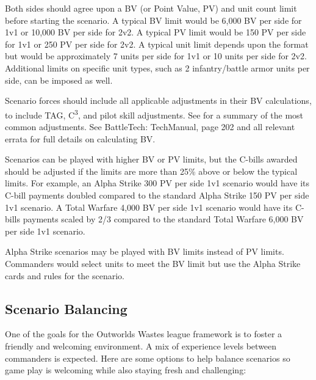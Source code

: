 \documentclass{article}
\begin{document}
Both sides should agree upon a BV (or Point Value, PV) and unit count limit before starting the scenario.
A typical BV limit would be 6,000 BV per side for 1v1 or 10,000 BV per side for 2v2.
A typical PV limit would be 150 PV per side for 1v1 or 250 PV per side for 2v2.
A typical unit limit depends upon the format but would be approximately 7 units per side for 1v1 or 10 units per side for 2v2.
Additional limits on specific unit types, such as 2 infantry/battle armor units per side, can be imposed as well.

Scenario forces should include all applicable adjustments in their BV calculations, to include TAG, C\textsuperscript{3}, and pilot skill adjustments.
See \pageref{sec:force_bv_adjustments} for a summary of the most common adjustments.
See BattleTech: TechManual, page 202 and all relevant errata for full details on calculating BV.

Scenarios can be played with higher BV or PV limits, but the C-bills awarded should be adjusted if the limits are more than 25\% above or below the typical limits.
For example, an Alpha Strike 300 PV per side 1v1 scenario would have its C-bill payments doubled compared to the standard Alpha Strike 150 PV per side 1v1 scenario.
A Total Warfare 4,000 BV per side 1v1 scenario would have its C-bills payments scaled by 2/3 compared to the standard Total Warfare 6,000 BV per side 1v1 scenario.

Alpha Strike scenarios may be played with BV limits instead of PV limits.
Commanders would select units to meet the BV limit but use the Alpha Strike cards and rules for the scenario.

\newpage

\subsection{Scenario Balancing}

One of the goals for the Outworlds Wastes league framework is to foster a friendly and welcoming environment.
A mix of experience levels between commanders is expected.
Here are some options to help balance scenarios so game play is welcoming while also staying fresh and challenging:
\end{document}
